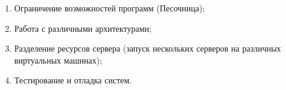 \begin{enumerate}
\item Ограничение возможностей программ (Песочница);
\item Работа с различными архитектурами;
\item Разделение ресурсов сервера (запуск нескольких серверов на различных виртуальных машинах);
\item Тестирование и отладка систем.
\end{enumerate}
